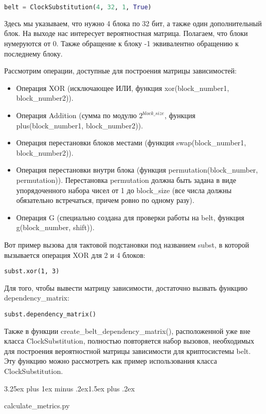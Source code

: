 \documentclass[a4paper,12pt]{report}
\makeatletter
\theoremstyle{plain} %
\theoremstyle{definition}
\theoremstyle{remark}
\renewcommand{\subsection}{\@startsection{subsection}{2}{18pt}%
{3.25ex plus 1ex minus .2ex}{1.5ex plus .2ex}%
{\normalfont\large\bfseries\raggedright}}%
\makeatother
\begin{document}
\begin{large}
\begin{lstlisting}[language=Python]
belt = ClockSubstitution(4, 32, 1, True)
\end{lstlisting}
Здесь мы указываем, что нужно 4 блока по 32 бит, а также один дополнительный блок. На выходе нас интересует вероятностная матрица. Полагаем, что блоки нумеруются от 0. Также обращение к блоку -1 эквивалентно обращению к последнему блоку.

Рассмотрим операции, доступные для построения матрицы зависимостей:

\begin{itemize}
\item Операция XOR (исключающее ИЛИ, функция xor(block\_number1, block\_number2)).
\item Операция Addition (сумма по модулю $2^{block\_size}$, функция plus(block\_number1, block\_number2)).
\item Операция перестановки блоков местами (функция swap(block\_number1, block\_number2)).
\item Операция перестановки внутри блока (функция permutation(block\_number, permutation)). Перестановка permutation должна быть задана в виде упорядоченного набора чисел от 1 до block\_size (все числа должны обязательно встречаться, причем ровно по одному разу).
\item Операция G (специально создана для проверки работы на belt, функция g(block\_number, shift)).
\end{itemize}

Вот пример вызова для тактовой подстановки под названием subst, в которой вызывается операция XOR для 2 и 4 блоков:

\begin{lstlisting}
subst.xor(1, 3)
\end{lstlisting}
Для того, чтобы вывести матрицу зависимости, достаточно вызвать функцию dependency\_matrix:

\begin{lstlisting}
subst.dependency_matrix()
\end{lstlisting}

Также в функции create\_belt\_dependency\_matrix(), расположенной уже вне класса ClockSubstitution, полностью повторяется набор вызовов, необходимых для построения вероятностной матрицы зависимости для криптосистемы belt. Эту функцию можно рассмотреть как пример использования класса ClockSubstitution.

\subsection{calculate\_metrics.py}


\end{large}
\end{document}
